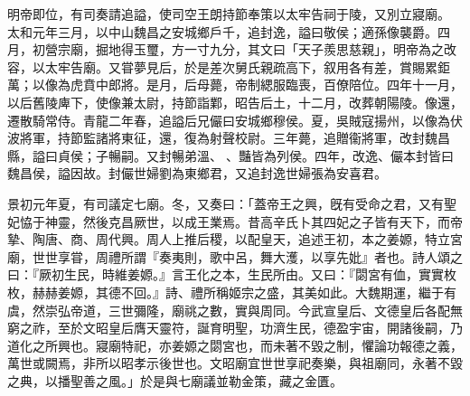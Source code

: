 \begin{pinyinscope}
 
明帝即位，有司奏請追謚，使司空王朗持節奉策以太牢告祠于陵，又別立寢廟。
 太和元年三月，以中山魏昌之安城鄉戶千，追封逸，謚曰敬侯；適孫像襲爵。四月，初營宗廟，掘地得玉璽，方一寸九分，其文曰「天子羨思慈親」，明帝為之改容，以太牢告廟。又甞夢見后，於是差次舅氏親疏高下，叙用各有差，賞賜累鉅萬；以像為虎賁中郎將。是月，后母薨，帝制緦服臨喪，百僚陪位。四年十一月，以后舊陵庳下，使像兼太尉，持節詣鄴，昭告后土，十二月，改葬朝陽陵。像還，遷散騎常侍。青龍二年春，追謚后兄儼曰安城鄉穆侯。夏，吳賊寇揚州，以像為伏波將軍，持節監諸將東征，還，復為射聲校尉。三年薨，追贈衞將軍，改封魏昌縣，謚曰貞侯；子暢嗣。又封暢弟溫、𩋾、豔皆為列侯。四年，改逸、儼本封皆曰魏昌侯，謚因故。封儼世婦劉為東鄉君，又追封逸世婦張為安喜君。
 
 
 
 
 景初元年夏，有司議定七廟。冬，又奏曰：「蓋帝王之興，旣有受命之君，又有聖妃恊于神靈，然後克昌厥世，以成王業焉。昔高辛氏卜其四妃之子皆有天下，而帝摯、陶唐、商、周代興。周人上推后稷，以配皇天，追述王初，本之姜嫄，特立宮廟，世世享甞，周禮所謂『奏夷則，歌中呂，舞大濩，以享先妣』者也。詩人頌之曰：『厥初生民，時維姜嫄。』言王化之本，生民所由。又曰：『閟宮有侐，實實枚枚，赫赫姜嫄，其德不回。』詩、禮所稱姬宗之盛，其美如此。大魏期運，繼于有虞，然崇弘帝道，三世彌隆，廟祧之數，實與周同。今武宣皇后、文德皇后各配無窮之祚，至於文昭皇后膺天靈符，誕育明聖，功濟生民，德盈宇宙，開諸後嗣，乃道化之所興也。寢廟特祀，亦姜嫄之閟宮也，而未著不毀之制，懼論功報德之義，萬世或闕焉，非所以昭孝示後世也。文昭廟宜世世享祀奏樂，與祖廟同，永著不毀之典，以播聖善之風。」於是與七廟議並勒金策，藏之金匱。
 

\end{pinyinscope}
